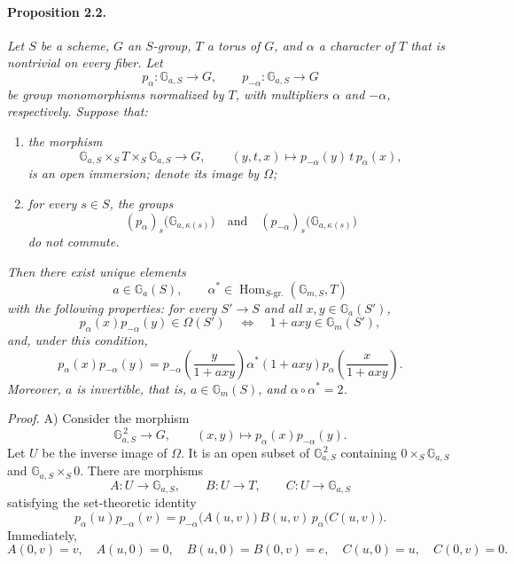 \paragraph{\textbf{Proposition 2.2.}}
\emph{Let \(S\) be a scheme, \(G\) an \(S\)-group, \(T\) a torus
of \(G\), and \(\alpha\) a character of \(T\) that is nontrivial
on every fiber. Let}
\[
  p_\alpha\colon\mathbb G_{a,S}\longrightarrow G,\qquad
  p_{-\alpha}\colon\mathbb G_{a,S}\longrightarrow G
\]
\emph{be group monomorphisms normalized by \(T\), with
multipliers \(\alpha\) and \(-\alpha\), respectively. Suppose
that:}
\begin{enumerate}
\item[\textup{(i)}] \emph{the morphism}
  \[
    \mathbb G_{a,S}\times_S T\times_S\mathbb G_{a,S}
      \longrightarrow G,
    \qquad
    (y,t,x)\longmapsto p_{-\alpha}(y)\,t\,p_\alpha(x),
  \]
  \emph{is an open immersion; denote its image by \(\Omega\);}
\item[\textup{(ii)}] \emph{for every \(s\in S\), the groups}
  \[
    (p_\alpha)_s\bigl(\mathbb G_{a,\kappa(s)}\bigr)
    \quad\text{and}\quad
    (p_{-\alpha})_s\bigl(\mathbb G_{a,\kappa(s)}\bigr)
  \]
  \emph{do not commute.}
\end{enumerate}
\emph{Then there exist unique elements}
\[
  a\in\mathbb G_a(S),\qquad
  \alpha^\ast\in
    \operatorname{Hom}_{S\text{-gr.}}(\mathbb G_{m,S},T)
\]
\emph{with the following properties: for every \(S'\to S\) and
all \(x,y\in\mathbb G_a(S')\),}
\[
  p_\alpha(x)p_{-\alpha}(y)\in\Omega(S')
  \quad\Longleftrightarrow\quad
  1+axy\in\mathbb G_m(S'),
\]
\emph{and, under this condition,}
\[
  p_\alpha(x)p_{-\alpha}(y)
   =p_{-\alpha}\left(\frac{y}{1+axy}\right)
      \alpha^\ast(1+axy)
      p_\alpha\left(\frac{x}{1+axy}\right).
\]
\emph{Moreover, \(a\) is invertible, that is,
\(a\in\mathbb G_m(S)\), and \(\alpha\circ\alpha^\ast=2\).}

\medskip
\noindent\emph{Proof.}
\textup{A)} Consider the morphism
\[
  \mathbb G_{a,S}^{\,2}\longrightarrow G,\qquad
  (x,y)\longmapsto p_\alpha(x)p_{-\alpha}(y).
\]
Let \(U\) be the inverse image of \(\Omega\). It is an open subset
of \(\mathbb G_{a,S}^{\,2}\) containing
\(0\times_S\mathbb G_{a,S}\) and
\(\mathbb G_{a,S}\times_S0\). There are morphisms
\[
  A\colon U\longrightarrow\mathbb G_{a,S},\qquad
  B\colon U\longrightarrow T,\qquad
  C\colon U\longrightarrow\mathbb G_{a,S}
\]
satisfying the set-theoretic identity
\[
  p_\alpha(u)p_{-\alpha}(v)
    =p_{-\alpha}\bigl(A(u,v)\bigr)\,
      B(u,v)\,p_\alpha\bigl(C(u,v)\bigr).
\]
Immediately,
\[
  A(0,v)=v,\quad A(u,0)=0,\quad
  B(u,0)=B(0,v)=e,\quad
  C(u,0)=u,\quad C(0,v)=0.
\]

